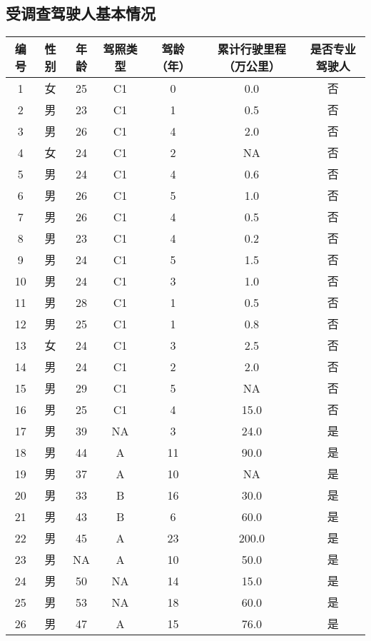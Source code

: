 \documentclass[unicode,master,printedition]{seuthesis} %
\begin{document}
\begin{Thanks}

\end{Thanks}


%

\begin{Appendix}
  \chapter{受调查驾驶人基本情况}%
\begin{table}[ht]
\begin{center}
\begin{tabular}{ccccccc}
  \hline
编号 & 性别 & 年龄 & 驾照类型 & 驾龄（年） & 累计行驶里程（万公里） & 是否专业驾驶人 \\ 
  \hline
  1 & 女 & 25 & C1 & 0 & 0.0 & 否 \\ 
  2 & 男 & 23 & C1 & 1 & 0.5 & 否 \\ 
  3 & 男 & 26 & C1 & 4 & 2.0 & 否 \\ 
  4 & 女 & 24 & C1 & 2 & NA & 否 \\ 
  5 & 男 & 24 & C1 & 4 & 0.6 & 否 \\ 
  6 & 男 & 26 & C1 & 5 & 1.0 & 否 \\ 
  7 & 男 & 26 & C1 & 4 & 0.5 & 否 \\ 
  8 & 男 & 23 & C1 & 4 & 0.2 & 否 \\ 
  9 & 男 & 24 & C1 & 5 & 1.5 & 否 \\ 
 10 & 男 & 24 & C1 & 3 & 1.0 & 否 \\ 
 11 & 男 & 28 & C1 & 1 & 0.5 & 否 \\ 
 12 & 男 & 25 & C1 & 1 & 0.8 & 否 \\ 
 13 & 女 & 24 & C1 & 3 & 2.5 & 否 \\ 
 14 & 男 & 24 & C1 & 2 & 2.0 & 否 \\ 
 15 & 男 & 29 & C1 & 5 & NA & 否 \\ 
 16 & 男 & 25 & C1 & 4 & 15.0 & 否 \\ 
 17 & 男 & 39 & NA & 3 & 24.0 & 是 \\ 
 18 & 男 & 44 & A & 11 & 90.0 & 是 \\ 
 19 & 男 & 37 & A & 10 & NA & 是 \\ 
 20 & 男 & 33 & B & 16 & 30.0 & 是 \\ 
 21 & 男 & 43 & B & 6& 60.0 & 是 \\ 
 22 & 男 & 45 & A & 23 & 200.0 & 是 \\ 
 23 & 男 & NA & A & 10 & 50.0 & 是 \\ 
 24 & 男 & 50 & NA & 14 & 15.0 & 是 \\ 
 25 & 男 & 53 & NA & 18 & 60.0 & 是 \\ 
 26 & 男 & 47 & A & 15 & 76.0 & 是 \\ 
   \hline
\end{tabular}
\label{basic_table}
\end{center}
\end{table}


\end{Appendix}
\end{document}

